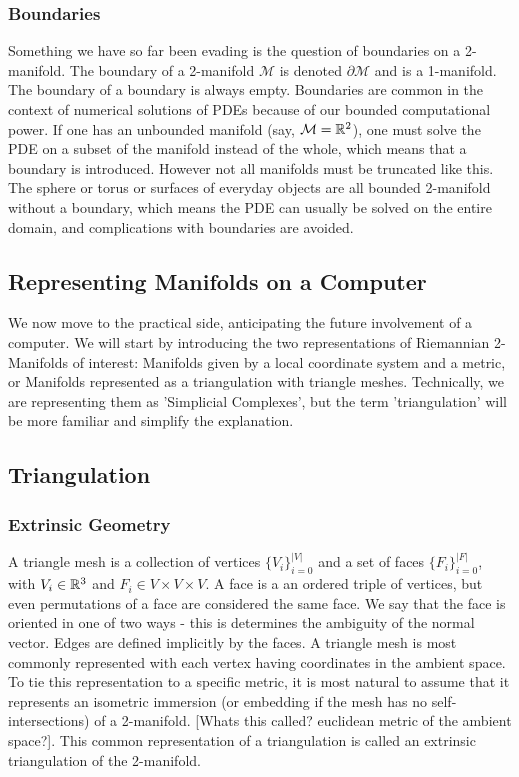 \subsubsection*{Boundaries}
Something we have so far been evading is the question of boundaries on a 2-manifold. The boundary of a 2-manifold $\mathcal{M}$ is denoted $\partial \mathcal{M}$ and is a 1-manifold. The boundary of a boundary is always empty. Boundaries are common in the context of numerical solutions of PDEs because of our bounded computational power. If one has an unbounded manifold (say, $\mathcal{M} = \mathbb{R}^2$), one must solve the PDE on a subset of the manifold instead of the whole, which means that a boundary is introduced. However not all manifolds must be truncated like this. The sphere or torus or surfaces of everyday objects are all bounded 2-manifold without a boundary, which means the PDE can usually be solved on the entire domain, and complications with boundaries are avoided.

\subsection*{Representing Manifolds on a Computer}

We now move to the practical side, anticipating the future involvement of a computer. We will start by introducing the two representations of Riemannian 2-Manifolds of interest: Manifolds given by a local coordinate system and a metric, or Manifolds represented as a triangulation with triangle meshes. Technically, we are representing them as 'Simplicial Complexes', but the term 'triangulation' will be more familiar and simplify the explanation.

\subsection*{Triangulation}
\subsubsection*{Extrinsic Geometry}
A triangle mesh is a collection of vertices $\{V_i\}_{i=0}^{|V|}$ and a set of faces $\{F_i\}_{i=0}^{|F|}$, with $V_i \in \mathbb{R}^3$ and $F_i \in V \times V \times V$. A face is a an ordered triple of vertices, but even permutations of a face are considered the same face. We say that the face is oriented in one of two ways - this is determines the ambiguity of the normal vector. Edges are defined implicitly by the faces.
A triangle mesh is most commonly represented with each vertex having coordinates in the ambient space. To tie this representation to a specific metric, it is most natural to assume that it represents an isometric immersion (or embedding if the mesh has no self-intersections) of a 2-manifold. [Whats this called? euclidean metric of the ambient space?]. This common representation of a triangulation is called an extrinsic triangulation of the 2-manifold.

